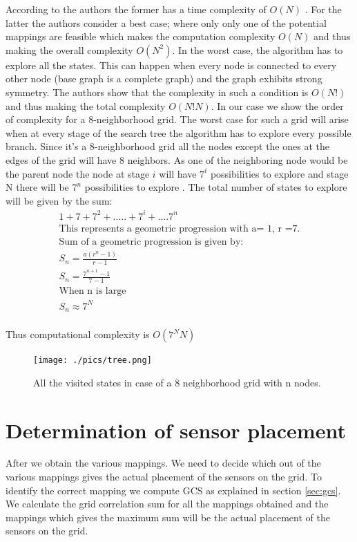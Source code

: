 According to the authors the former has a time complexity of $O(N)$ . For the latter the authors consider a best case; where only only one of the potential mappings are feasible which makes the computation complexity $O(N)$ and thus making the overall complexity $O(N^2)$. In the worst case, the algorithm has to explore all the states. This can happen when every node is connected to every other node (base graph is a complete graph) and the graph exhibits strong symmetry. The authors show that the complexity in such a condition is $O(N!)$ and thus making the total complexity $O(N!N)$.
In our case we show the order of complexity for a 8-neighborhood grid. The worst case for such a grid will arise when at every stage of the search tree the algorithm has to explore every possible branch. Since it's a 8-neighborhood grid all the nodes except the ones at the edges of the grid will have 8 neighbors. As one of the neighboring node would be the parent node the node at stage $i$ will have $7^{i}$ possibilities to explore and stage N there will be $7^n$ possibilities to explore . The total number of states to explore will be given by the sum:\\

\begin{align*}
1 + 7 + 7^2+ . . . . .+7^i+....7^n\\
\text{This represents a geometric progression with a= 1, r =7.}\\
\text{Sum of a geometric progression is given by:}\\
S_{n}=\frac{a(r^n-1)}{r-1}\\
S_{n}=\frac{7^{n+1} -1}{7-1} \\
\text{When n is large}\\
S_{n} \approx 7^N\\
\end{align*}

Thus computational complexity is $O(7^NN)$

\begin{figure}
\texttt{[image: ./pics/tree.png]}
\caption{All the visited states in case of a 8 neighborhood grid with n nodes.}
\label{fig:ccO}

\end{figure}

\section{Determination of sensor placement}
\label{ref:rotationalSym}
After we obtain the various mappings. We need to decide which out of the various mappings gives the actual placement of the sensors on the grid. To identify the correct mapping we compute GCS as explained in section \ref{sec:gcs}. We calculate the grid correlation sum for all the mappings obtained and the mappings which gives the maximum sum will be the actual placement of the sensors on the grid. 
